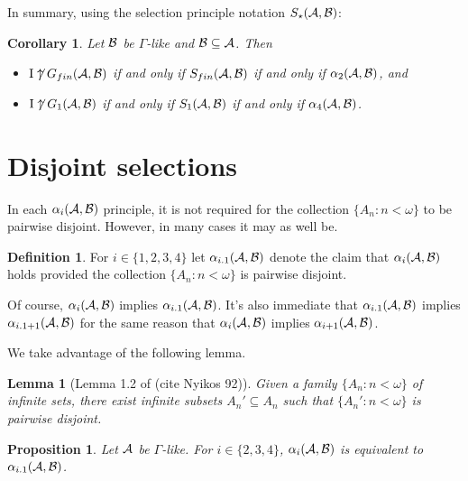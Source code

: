 \documentclass{amsart}
\theoremstyle{plain}
\newtheorem{lemma}[theorem]{Lemma}
\newtheorem{corollary}[theorem]{Corollary}
\newtheorem{proposition}[theorem]{Proposition}
\theoremstyle{definition}
\newtheorem{definition}[theorem]{Definition}
\theoremstyle{remark}
\theoremstyle{plain}
\theoremstyle{definition}
\theoremstyle{remark}
\begin{document}
In summary, using the selection principle notation \(S_\star(\mathcal{A},\mathcal{B})\):

\begin{corollary}
Let \(\mathcal{B}\) be \(\Gamma\)-like and \(\mathcal{B}\subseteq\mathcal{A}\).
Then 
\begin{itemize}
\item \(\mathrm{I}\not\uparrow G_{fin}(\mathcal{A},\mathcal{B})\) if and only if
\(S_{fin}(\mathcal{A},\mathcal{B})\) if and only if
\(\alpha_2(\mathcal{A},\mathcal{B})\), and
\item \(\mathrm{I}\not\uparrow G_{1}(\mathcal{A},\mathcal{B})\) if and only if
\(S_{1}(\mathcal{A},\mathcal{B})\) if and only if
\(\alpha_4(\mathcal{A},\mathcal{B})\).
\end{itemize}
\end{corollary}

\section{Disjoint selections}

In each \(\alpha_i(\mathcal{A},\mathcal{B})\) principle, it is not required for the collection
\(\{A_n:n<\omega\}\) to be pairwise disjoint. However, in many cases it may as
well be.

\begin{definition}
For \(i\in\{1,2,3,4\}\) let \(\alpha_{i.1}(\mathcal{A},\mathcal{B})\) denote the claim that
\(\alpha_i(\mathcal{A},\mathcal{B})\) holds provided the collection \(\{A_n:n<\omega\}\)
is pairwise disjoint.
\end{definition}

Of course, \(\alpha_i(\mathcal{A},\mathcal{B})\) implies \(\alpha_{i.1}(\mathcal{A},\mathcal{B})\).
It's also immediate that \(\alpha_{i.1}(\mathcal{A},\mathcal{B})\) implies
\(\alpha_{i.1+1}(\mathcal{A},\mathcal{B})\) for the same reason that \(\alpha_i(\mathcal{A},\mathcal{B})\)
implies \(\alpha_{i+1}(\mathcal{A},\mathcal{B})\). 


We take advantage of the following lemma.

\begin{lemma}[Lemma 1.2 of (cite Nyikos 92)]
Given a family \(\{A_n:n<\omega\}\) of infinite sets, there exist infinite subsets
\(A_n'\subseteq A_n\) such that \(\{A_n':n<\omega\}\) is pairwise disjoint.
\end{lemma}

\begin{proposition}
Let \(\mathcal{A}\) be \(\Gamma\)-like.
For \(i\in\{2,3,4\}\), \(\alpha_i(\mathcal{A},\mathcal{B})\) is equivalent to
\(\alpha_{i.1}(\mathcal{A},\mathcal{B})\).
\end{proposition}
\end{document}
